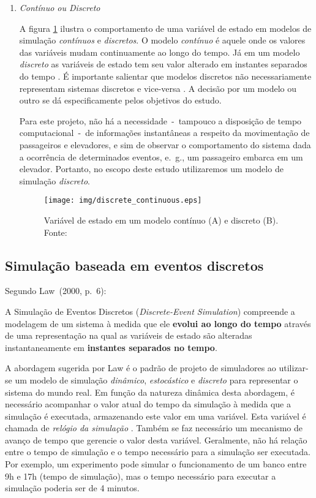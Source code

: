 \begin{enumerate}
\item \textit{Contínuo ou Discreto}

A figura \ref{fig:disccont} ilustra o comportamento de uma variável de estado em
modelos de simulação \textit{contínuos} e \textit{discretos}. O modelo
\textit{contínuo} é aquele onde os valores das variáveis mudam continuamente ao
longo do tempo. Já em um modelo \textit{discreto} as variáveis de estado tem seu
valor alterado em instantes separados do tempo \cite{Banks}. É importante
salientar que modelos discretos não necessariamente representam sistemas
discretos e vice-versa \cite{Law}. A decisão por um modelo ou outro se dá
especificamente pelos objetivos do estudo.

Para este projeto, não há a necessidade~-~tampouco a disposição de tempo
computacional~-~de informações instantâneas a respeito da movimentação de
passageiros e elevadores, e sim de observar o comportamento do sistema dada a
ocorrência de determinados eventos, e.~g., um passageiro embarca em um elevador.
Portanto, no escopo deste estudo utilizaremos um modelo de simulação
\textit{discreto}.

\begin{figure}[htb!]
\centering\texttt{[image: img/discrete\_continuous.eps]}
\caption[Variável de estado em um modelo contínuo e discreto]{\label{fig:disccont}Variável de estado em um modelo contínuo (A) e discreto (B). Fonte:~\cite{Banks}}
\end{figure}

\end{enumerate}

\subsection{Simulação baseada em eventos discretos}

Segundo Law~(2000, p.~6):

\begin{directcite}
A Simulação de Eventos Discretos (\textit{Discrete-Event Simulation}) compreende
a modelagem de um sistema à medida que ele \textbf{evolui ao longo do tempo}
através de uma representação na qual as variáveis de estado são alteradas
instantaneamente em \textbf{instantes separados no tempo}.
\end{directcite}

A abordagem sugerida por Law é o padrão de projeto de simuladores ao utilizar-se
um modelo de simulação \textit{dinâmico}, \textit{estocástico} e
\textit{discreto} para representar o sistema do mundo real. Em função da
natureza dinâmica desta abordagem, é necessário acompanhar o valor atual do
tempo da simulação à medida que a simulação é executada, armazenando este valor
em uma variável. Esta variável é chamada de \textit{relógio da simulação}
\cite{Law}. Também se faz necessário um mecanismo de avanço de tempo que
gerencie o valor desta variável. Geralmente, não há relação entre o tempo de
simulação e o tempo necessário para a simulação ser executada. Por exemplo, um
experimento pode simular o funcionamento de um banco entre 9h e 17h (tempo de
simulação), mas o tempo necessário para executar a simulação poderia ser de 4
minutos.

